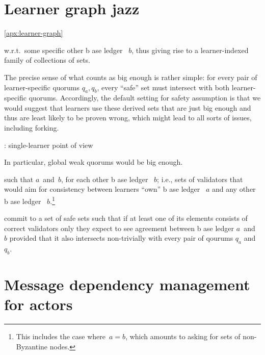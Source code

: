 \documentclass[%
dvipsnames]{article}
\theoremstyle{definition}
\newcommand{\base}[1][ ]{%
  b\ase[#1]%
}
\newcommand{\ase}[1][ ]{%
  ase ledger%
  \ifthenelse{\equal{#1}{ }}{}{#1}\xspace%
}
\newcommand{\q}[2][]{%
  q#1_{#2}%
}
\newenvironment{theapx}{}{}%
\begin{document}
\begin{theapx}
\appendix

\section{Learner graph jazz}
\ref{apx:learner-graph}

w.r.t.\ some specific other \base \(b\), %
thus giving rise to a learner-indexed family of collections of sets. %

The precise sense of what counts as big enough is rather simple:
for every pair of learner-specific quorums \(\q{a},\q{b}\), %
every ``safe'' set must intersect with both learner-specific quorums. %
Accordingly, %
the default setting for safety assumption is that 
we would suggest that learners use these derived sets that are just big enough
and thus are least likely to be proven wrong,
which might lead to all sorts of issues,
including forking.\xspace%


: single-learner point of view

In particular, %
global weak quorums would be big enough. %

 such that 
\(a\) and \(b\), for each other \base \(b\); %
i.e., sets of validators that would aim for consistency between learners “own” \base \(a\) and any other \base \(b\).\footnote{%
  This includes the case where \(a=b\), %
  which amounts to asking for sets of non-Byzantine nodes. %
}

commit to a set of safe sets such that %
if at least one of its elements consists of correct validators only %
they expect to see agreement between \base[s] \(a\) and \(b\) %
provided that it also intersects non-trivially with %
every pair of qourums \(\q{a}\) and \(\q{b}\). %



\section{Message dependency management for actors}


\end{theapx}
\end{document}
